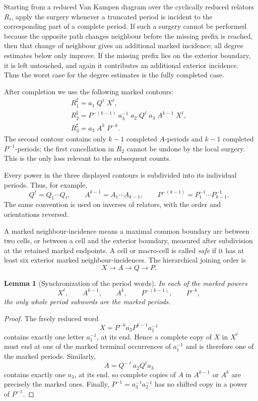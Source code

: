 \documentclass{article}
\newtheorem{lm}[theorem]{Lemma}
\begin{document}
Starting from a reduced Van Kampen diagram over the cyclically reduced
relators $\overline R_i$, apply the surgery whenever a truncated period is
incident to the corresponding part of a complete period.  If such a surgery
cannot be performed because the opposite path changes neighbour before the
missing prefix is reached, then that change of neighbour gives an additional
marked incidence; all degree estimates below only improve.  If the missing
prefix lies on the exterior boundary, it is left untouched, and again it
contributes an additional exterior incidence.  Thus the worst case for the
degree estimates is the fully completed case.

After completion we use the following marked contours:
\[
\begin{gathered}
\boxed{R_1^{\sharp}=a_1\;Q^{\ell}\;X^{\ell},}\\[-1pt]
\boxed{R_2^{\sharp}=P^{-(k-1)}\;a_3^{-1}\;a_2\;Q^{\ell}\;a_3\;A^{k-1}\;X^{\ell},}\\[-1pt]
\boxed{R_3^{\sharp}=a_3\;A^k\;P^{-k}.}
\end{gathered}
\]
The second contour contains only $k-1$ completed $A$-periods and $k-1$
completed $P^{-1}$-periods; the first cancellation in $R_2$ cannot be undone
by the local surgery.  This is the only loss relevant to the subsequent
counts.

Every power in the three displayed contours is subdivided into its individual
periods.  Thus, for example,
\[
 Q^{\ell}=Q_1\cdots Q_{\ell},\qquad
 A^{k-1}=A_1\cdots A_{k-1},\qquad
 P^{-(k-1)}=P_1^{-1}\cdots P_{k-1}^{-1}.
\]
The same convention is used on inverses of relators, with the order and
orientations reversed.

A marked neighbour-incidence means a maximal common boundary arc between two
cells, or between a cell and the exterior boundary, measured after
subdivision at the retained marked endpoints.  A cell or macro-cell is called
\emph{safe} if it has at least six exterior marked neighbour-incidences.
The hierarchical joining order is
\[
        X\longrightarrow A\longrightarrow Q\longrightarrow P.
\]

\begin{lm}[Synchronization of the period words]
In each of the marked powers
\[
 X^{\ell},\qquad A^{k-1},\qquad A^k,
 \qquad P^{-(k-1)},\qquad P^{-k},
\]
the only whole period subwords are the marked periods.
\end{lm}

\begin{proof}
The freely reduced word
\[
        X=P^{-k}a_3P^{k-1}a_1^{-1}
\]
contains exactly one letter $a_1^{-1}$, at its end.  Hence a complete copy of
$X$ in $X^{\ell}$ must end at one of the marked terminal occurrences of
$a_1^{-1}$ and is therefore one of the marked periods.  Similarly,
\[
        A=Q^{-\ell}a_2Q^{\ell}a_3
\]
contains exactly one $a_3$, at its end, so complete copies of $A$ in
$A^{k-1}$ or $A^k$ are precisely the marked ones.  Finally,
$P^{-1}=a_3^{-1}a_2^{-1}$ has no shifted copy in a power of $P^{-1}$.
\end{proof}
\end{document}
